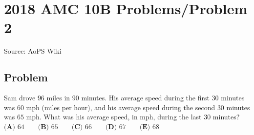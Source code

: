 \documentclass[12pt]{article}
\begin{document}
\section*{{2018 AMC 10B Problems/Problem 2}}
Source: AoPS Wiki

\subsection*{Problem}
Sam drove $96$ miles in $90$ minutes. His average speed during the first $30$ minutes was $60$ mph (miles per hour), and his average speed during the second $30$ minutes was $65$ mph. What was his average speed, in mph, during the last $30$ minutes? $\textbf{(A) } 64 \qquad \textbf{(B) } 65 \qquad \textbf{(C) } 66 \qquad \textbf{(D) } 67 \qquad \textbf{(E) } 68$
\end{document}

